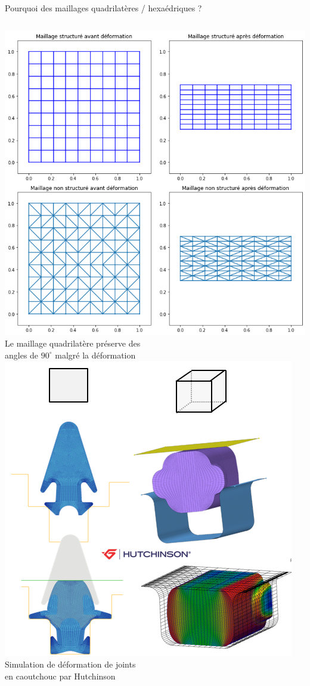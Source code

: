 \begin{frame}{Pourquoi des maillages quadrilatères / hexaédriques ?}
\begin{columns}[T]
        \begin{column}{.6\textwidth}
             {
                \centering \small     
                \includegraphics[width=.8\linewidth]{img/choix_maillage/deformation_low_angle.png}\\
                Le maillage quadrilatère préserve des\\ angles de $90^\circ$ malgré la déformation
            }
             {
                \centering \small     
                \includegraphics[width=.8\linewidth]{img/new_images/simu_hutchinson_2d3d.png}\\
                Simulation de déformation de joints\\ en caoutchouc par Hutchinson
            }
        \end{column}
    \end{columns}
\end{frame}




